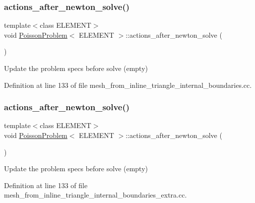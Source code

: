 \subsubsection{\texorpdfstring{actions\+\_\+after\+\_\+newton\+\_\+solve()}{actions\_after\_newton\_solve()}\hspace{0.1cm}{\footnotesize\ttfamily [1/2]}}
{\footnotesize\ttfamily template$<$class E\+L\+E\+M\+E\+NT$>$ \\
void \hyperlink{classPoissonProblem}{Poisson\+Problem}$<$ E\+L\+E\+M\+E\+NT $>$\+::actions\+\_\+after\+\_\+newton\+\_\+solve (\begin{DoxyParamCaption}{ }\end{DoxyParamCaption})\hspace{0.3cm}{\ttfamily [inline]}}



Update the problem specs before solve (empty) 



Definition at line 133 of file mesh\+\_\+from\+\_\+inline\+\_\+triangle\+\_\+internal\+\_\+boundaries.\+cc.

\mbox{\label{classPoissonProblem_a7a9478d8e1e5c7d3a886b00ab7d50bbd}} 
\subsubsection{\texorpdfstring{actions\+\_\+after\+\_\+newton\+\_\+solve()}{actions\_after\_newton\_solve()}\hspace{0.1cm}{\footnotesize\ttfamily [2/2]}}
{\footnotesize\ttfamily template$<$class E\+L\+E\+M\+E\+NT$>$ \\
void \hyperlink{classPoissonProblem}{Poisson\+Problem}$<$ E\+L\+E\+M\+E\+NT $>$\+::actions\+\_\+after\+\_\+newton\+\_\+solve (\begin{DoxyParamCaption}{ }\end{DoxyParamCaption})\hspace{0.3cm}{\ttfamily [inline]}}



Update the problem specs before solve (empty) 



Definition at line 133 of file mesh\+\_\+from\+\_\+inline\+\_\+triangle\+\_\+internal\+\_\+boundaries\+\_\+extra.\+cc.

